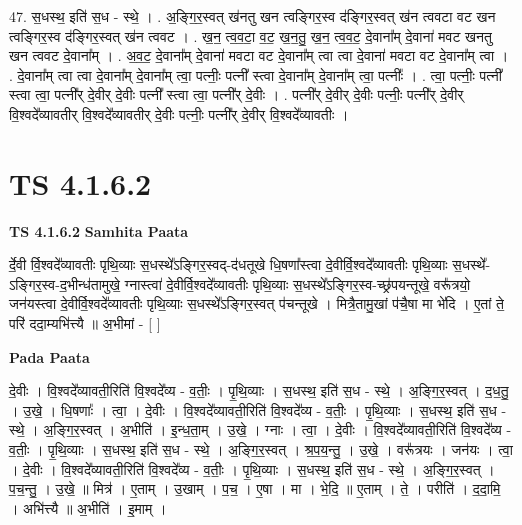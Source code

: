 \documentclass[17pt]{extarticle}
\begin{document}
47. स॒धस्थ॒ इति॑ स॒ध - स्थे॒ । . अ॒ङ्गि॒र॒स्वत् ख॑नतु खन त्वङ्गिर॒स्व द॑ङ्गिर॒स्वत् ख॑न त्ववटा वट खन त्वङ्गिर॒स्व द॑ङ्गिर॒स्वत् ख॑न त्ववट । . ख॒न॒ त्व॒व॒टा॒ व॒ट॒ ख॒न॒तु॒ ख॒न॒ त्व॒व॒ट॒ दे॒वाना᳚म् दे॒वाना॑ मवट खनतु खन त्ववट दे॒वाना᳚म् । . अ॒व॒ट॒ दे॒वाना᳚म् दे॒वाना॑ मवटा वट दे॒वाना᳚म् त्वा त्वा दे॒वाना॑ मवटा वट दे॒वाना᳚म् त्वा । . दे॒वाना᳚म् त्वा त्वा दे॒वाना᳚म् दे॒वाना᳚म् त्वा॒ पत्नीः॒ पत्नी᳚ स्त्वा दे॒वाना᳚म् दे॒वाना᳚म् त्वा॒ पत्नीः᳚ । . त्वा॒ पत्नीः॒ पत्नी᳚ स्त्वा त्वा॒ पत्नी᳚र् दे॒वीर् दे॒वीः पत्नी᳚ स्त्वा त्वा॒ पत्नी᳚र् दे॒वीः । . पत्नी᳚र् दे॒वीर् दे॒वीः पत्नीः॒ पत्नी᳚र् दे॒वीर् वि॒श्वदे᳚व्यावतीर् वि॒श्वदे᳚व्यावतीर् दे॒वीः पत्नीः॒ पत्नी᳚र् दे॒वीर् वि॒श्वदे᳚व्यावतीः । \newline
\pagebreak
{}

\section{ TS 4.1.6.2 }

\textbf{TS 4.1.6.2 } \newline
\textbf{Samhita Paata} \newline

र्दे॒वी र्वि॒श्वदे᳚व्यावतीः पृथि॒व्याः स॒धस्थे᳚ऽङ्गिर॒स्वद्-द॑धतूखे धि॒षणा᳚स्त्वा दे॒वीर्वि॒श्वदे᳚व्यावतीः पृथि॒व्याः स॒धस्थे᳚-ऽङ्गिर॒स्व-द॒भीन्ध॑तामुखे॒ ग्नास्त्वा॑ दे॒वीर्वि॒श्वदे᳚व्यावतीः पृथि॒व्याः स॒धस्थे᳚ऽङ्गिर॒स्व-च्छ्र॑पयन्तूखे॒ वरू᳚त्रयो॒ जन॑यस्त्वा दे॒वीर्वि॒श्वदे᳚व्यावतीः पृथि॒व्याः स॒धस्थे᳚ऽङ्गिर॒स्वत् प॑चन्तूखे । मित्रै॒तामु॒खां प॑चै॒षा मा भे॑दि । ए॒तां ते॒ परि॑ ददा॒म्यभि॑त्त्यै ॥ अ॒भीमां - [  ] \newline

\textbf{Pada Paata} \newline

दे॒वीः । वि॒श्वदे᳚व्यावती॒रिति॑ वि॒श्वदे᳚व्य - व॒तीः॒ । पृ॒थि॒व्याः । स॒धस्थ॒ इति॑ स॒ध - स्थे॒ । अ॒ङ्गि॒र॒स्वत् । द॒ध॒तु॒ । उ॒खे॒ । धि॒षणाः᳚ । त्वा॒ । दे॒वीः । वि॒श्वदे᳚व्यावती॒रिति॑ वि॒श्वदे᳚व्य - व॒तीः॒ । पृ॒थि॒व्याः । स॒धस्थ॒ इति॑ स॒ध - स्थे॒ । अ॒ङ्गि॒र॒स्वत् । अ॒भीति॑ । इ॒न्ध॒ता॒म् । उ॒खे॒ । ग्नाः । त्वा॒ । दे॒वीः । वि॒श्वदे᳚व्यावती॒रिति॑ वि॒श्वदे᳚व्य - व॒तीः॒ । पृ॒थि॒व्याः । स॒धस्थ॒ इति॑ स॒ध - स्थे॒ । अ॒ङ्गि॒र॒स्वत् । श्र॒प॒य॒न्तु॒ । उ॒खे॒ । वरू᳚त्रयः । जन॑यः । त्वा॒ । दे॒वीः । वि॒श्वदे᳚व्यावती॒रिति॑ वि॒श्वदे᳚व्य - व॒तीः॒ । पृ॒थि॒व्याः । स॒धस्थ॒ इति॑ स॒ध - स्थे॒ । अ॒ङ्गि॒र॒स्वत् । प॒च॒न्तु॒ । उ॒खे॒ ॥ मित्र॑ । ए॒ताम् । उ॒खाम् । प॒च॒ । ए॒षा । मा । भे॒दि॒ ॥ ए॒ताम् । ते॒ । परीति॑ । द॒दा॒मि॒ । अभि॑त्त्यै ॥ अ॒भीति॑ । इ॒माम् ।  \newline
\end{document}
